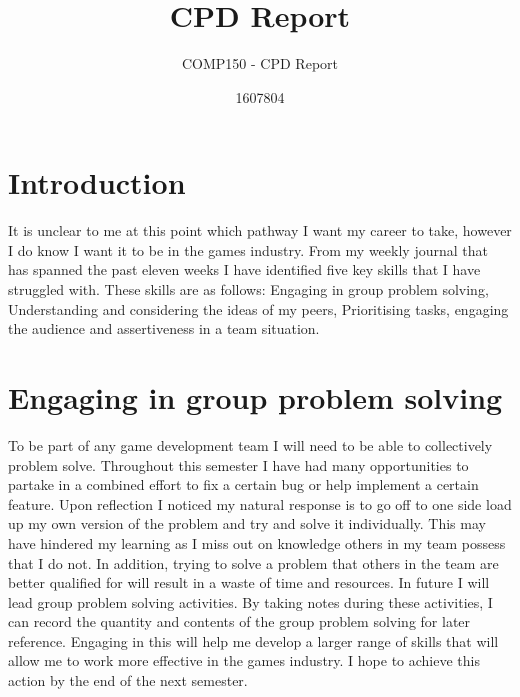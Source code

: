 \documentclass{scrartcl}
\title{CPD Report}
\subtitle{COMP150 - CPD Report}
\author{1607804}
\begin{document}
\maketitle

\section{Introduction}
It is unclear to me at this point which pathway I want my career to take, however I do know I want it to be in the games industry.  From my weekly journal that has spanned the past eleven weeks I have identified five key skills that I have struggled with. These skills are as follows: Engaging in group problem solving, Understanding and considering the ideas of my peers, Prioritising tasks, engaging the audience and assertiveness in a team situation.


\section{Engaging in group problem solving}
To be part of any game development team I will need to be able to collectively problem solve. Throughout this semester I have had many opportunities to partake in a combined effort to fix a certain bug or help implement a certain feature. Upon reflection I noticed my natural response is to go off to one side load up my own version of the problem and try and solve it individually. This may have hindered my learning as I miss out on knowledge others in my team possess that I do not. In addition, trying to solve a problem that others in the team are better qualified for will result in a waste of time and resources. In future I will lead group problem solving activities. By taking notes during these activities, I can record the quantity and contents of the group problem solving for later reference. Engaging in this will help me develop a larger range of skills that will allow me to work more effective in the games industry. I hope to achieve this action by the end of the next semester.
\end{document}
